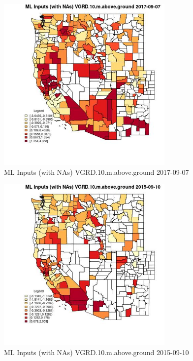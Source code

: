 \begin{figure} 
\centering  
\includegraphics[width=0.77\textwidth]{Code_Outputs/Report_ML_input_PM25_Step4_part_e_de_duplicated_aves_compiled_2019-05-21wNAs_CountyVGRD10mabovegroundMean2017-09-07.jpg} 
\caption{\label{fig:Report_ML_input_PM25_Step4_part_e_de_duplicated_aves_compiled_2019-05-21wNAsCountyVGRD10mabovegroundMean2017-09-07}ML Inputs (with NAs) VGRD.10.m.above.ground 2017-09-07} 
\end{figure} 
 

\begin{figure} 
\centering  
\includegraphics[width=0.77\textwidth]{Code_Outputs/Report_ML_input_PM25_Step4_part_e_de_duplicated_aves_compiled_2019-05-21wNAs_CountyVGRD10mabovegroundMean2015-09-10.jpg} 
\caption{\label{fig:Report_ML_input_PM25_Step4_part_e_de_duplicated_aves_compiled_2019-05-21wNAsCountyVGRD10mabovegroundMean2015-09-10}ML Inputs (with NAs) VGRD.10.m.above.ground 2015-09-10} 
\end{figure} 
 

